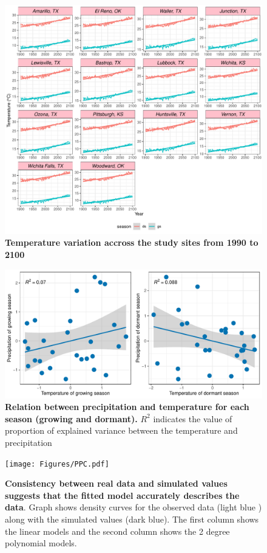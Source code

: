 \documentclass[12pt]{article}
\begin{document}
\begin{figure}[H]
		\centering
		\includegraphics[width=0.95\linewidth]{Figures/fig_tas_past_present_future.pdf}
		\caption{\textbf{Temperature variation accross the study sites from 1990 to 2100}}
		\label{Sup:temp_variation}
\end{figure}


\begin{figure}[H]
		\centering
		\includegraphics[width=0.95\linewidth]{Figures/Varianceexplained.pdf}
		\caption{\textbf{Relation between precipitation and temperature for each season (growing and dormant).} $R^2$ indicates the value of proportion of explained variance between the temperature and precipitation}
		\label{Sup:Correlation}
\end{figure}
	
\begin{figure}[H]
		\centering
		\texttt{[image: Figures/PPC.pdf]}
		\caption{\textbf{Consistency between real data and simulated values suggests that the fitted model accurately describes the data}. Graph shows density curves for the observed data (light blue ) along with the simulated values (dark blue). The first column shows the linear models and the second column shows the 2 degree polynomial models.}
		\label{Sup:PPC}
	\end{figure}
	
\end{document}
